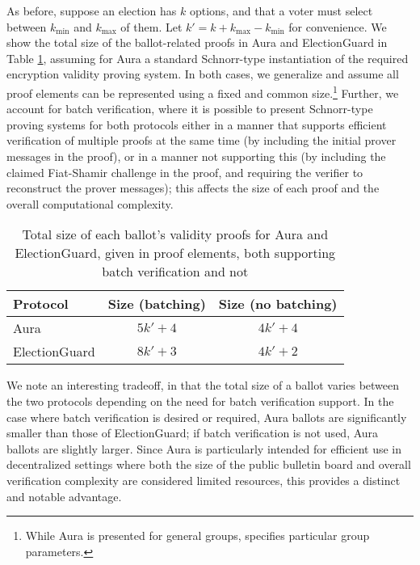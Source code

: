 \documentclass{llncs}
\begin{document}
As before, suppose an election has $k$ options, and that a voter must select between $k_{\text{min}}$ and $k_{\text{max}}$ of them.
Let $k' = k + k_{\text{max}} - k_{\text{min}}$ for convenience.
We show the total size of the ballot-related proofs in Aura and ElectionGuard in Table \ref{table:size}, assuming for Aura a standard Schnorr-type instantiation of the required encryption validity proving system.
In both cases, we generalize and assume all proof elements can be represented using a fixed and common size.\footnote{While Aura is presented for general groups, \cite{electionguard} specifies particular group parameters.}
Further, we account for batch verification, where it is possible to present Schnorr-type proving systems for both protocols either in a manner that supports efficient verification of multiple proofs at the same time (by including the initial prover messages in the proof), or in a manner not supporting this (by including the claimed Fiat-Shamir challenge in the proof, and requiring the verifier to reconstruct the prover messages); this affects the size of each proof and the overall computational complexity.

\begin{table}
    \centering
    \caption{Total size of each ballot's validity proofs for Aura and ElectionGuard, given in proof elements, both supporting batch verification and not}
    \label{table:size}
    \begin{tabular}{l|c|c|}
        Protocol & Size (batching) & Size (no batching) \\
        \hline
        Aura & $5k' + 4$ & $4k' + 4$ \\
        ElectionGuard & $8k' + 3$ & $4k' + 2$ \\
    \end{tabular}
\end{table}

We note an interesting tradeoff, in that the total size of a ballot varies between the two protocols depending on the need for batch verification support.
In the case where batch verification is desired or required, Aura ballots are significantly smaller than those of ElectionGuard; if batch verification is not used, Aura ballots are slightly larger.
Since Aura is particularly intended for efficient use in decentralized settings where both the size of the public bulletin board and overall verification complexity are considered limited resources, this provides a distinct and notable advantage.
\end{document}
